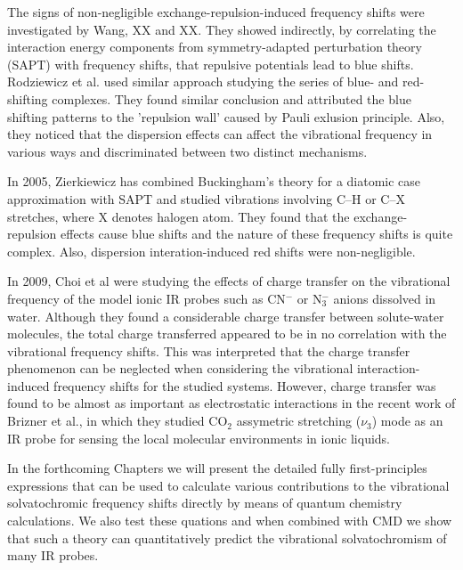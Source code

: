 \documentclass[a4paper,titlepage,twoside,fleqn,12pt]{book}
\begin{document}
\begin{refsection}
The signs of non-negligible exchange-repulsion-induced frequency shifts were 
investigated by Wang, XX and XX. They showed indirectly, by correlating the interaction
energy components from symmetry-adapted perturbation theory (SAPT) with frequency shifts, that repulsive potentials
lead to blue shifts. Rodziewicz et al. used similar approach studying the series of 
blue- and red-shifting complexes. They found similar conclusion and attributed the
blue shifting patterns to the 'repulsion wall' caused by Pauli exlusion principle. 
Also, they noticed that
the dispersion effects can affect the vibrational frequency in various ways
and discriminated between two distinct mechanisms.

In 2005, Zierkiewicz has combined Buckingham's theory for a diatomic case approximation with SAPT 
and studied vibrations involving C--H or C--X
stretches, where X denotes halogen atom. They found that the exchange-repulsion effects
cause blue shifts and the nature of these frequency shifts is quite complex. Also, dispersion
interation-induced red shifts were non-negligible.

In 2009, Choi et al were studying the effects of charge transfer on the vibrational
frequency of the model ionic IR probes such as CN$^-$ or N$_3^-$ anions dissolved in water. 
Although they found a considerable charge
transfer between solute-water molecules, the total charge transferred appeared to be in no
correlation with the vibrational frequency shifts. This was interpreted that the charge transfer 
phenomenon can be neglected when considering the vibrational interaction-induced frequency shifts
for the studied systems. However, charge transfer was found to be almost as important as electrostatic
interactions in the recent work of Brizner et al., in which they studied CO$_2$ assymetric
stretching ($\nu_3$) mode as an IR probe for sensing the local molecular environments in ionic
liquids.

In the forthcoming Chapters we will present the detailed fully first-principles expressions
that can be used to calculate various contributions to the vibrational solvatochromic frequency
shifts directly by means of quantum chemistry calculations. We also test these quations 
and when combined with CMD we show that such a theory can quantitatively predict the
vibrational solvatochromism of many IR probes.

\printbibliography[heading=subbibintoc,title={References}]
\end{refsection}

\end{document}
